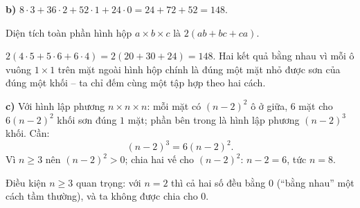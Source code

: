 {\textbf{b)}
$8\cdot 3+36\cdot 2+52\cdot 1+24\cdot 0=24+72+52=148$.
\begin{recallbox}Diện tích toàn phần hình hộp $a\times b\times c$ là $2(ab+bc+ca)$.\end{recallbox}
$2(4\cdot5+5\cdot6+6\cdot4)=2(20+30+24)=148$. Hai kết quả bằng nhau vì mỗi ô vuông $1\times 1$ trên mặt ngoài
hình hộp chính là đúng một mặt nhỏ được sơn của đúng một khối -- ta chỉ đếm cùng một tập hợp theo hai cách.

\textbf{c)}
Với hình lập phương $n\times n\times n$: mỗi mặt có $(n-2)^2$ ô ở giữa, $6$ mặt cho $6(n-2)^2$ khối sơn đúng $1$
mặt; phần bên trong là hình lập phương $(n-2)^3$ khối. Cần:
\[ (n-2)^3=6(n-2)^2. \]
Vì $n\ge 3$ nên $(n-2)^2>0$; chia hai vế cho $(n-2)^2$: $n-2=6$, tức $n=8$.
\begin{warnbox}Điều kiện $n\ge 3$ quan trọng: với $n=2$ thì cả hai số đều bằng $0$ (``bằng nhau'' một cách tầm
thường), và ta không được chia cho $0$.\end{warnbox}
}

